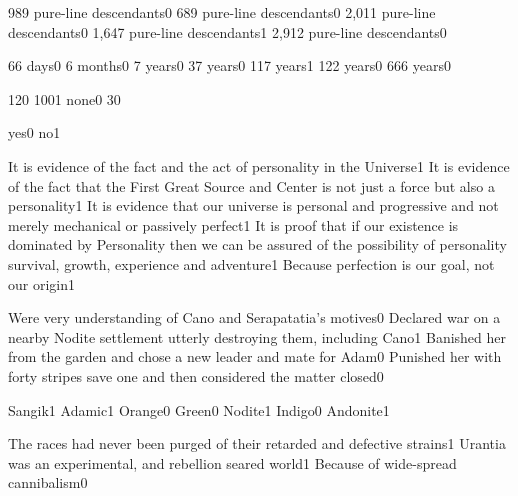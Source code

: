 {989 pure\hyp{}line descendants}{0}
{689 pure\hyp{}line descendants}{0}
{2,011 pure\hyp{}line descendants}{0}
{1,647 pure\hyp{}line descendants}{1}
{2,912 pure\hyp{}line descendants}{0}
\qstop

{66 days}{0}
{6 months}{0}
{7 years}{0}
{37 years}{0}
{117 years}{1}
{122 years}{0}
{666 years}{0}
\qstop

{12}{0}
{100}{1}
{none}{0}
{3}{0}
\qstop


{yes}{0}
{no}{1}
\qstop

{It is evidence of the fact and the act of personality in the Universe}{1}
{It is evidence of the fact that the First Great Source and Center is not just a force but also a personality}{1}
{It is evidence that our universe is personal and progressive and not merely mechanical or passively perfect}{1}
{It is proof that if our existence is dominated by Personality then we can be assured of the possibility of personality survival, growth, experience and adventure}{1}
{Because perfection is our goal, not our origin}{1}
\qstop

{Were very understanding of Cano and Serapatatia's motives}{0}
{Declared war on a nearby Nodite settlement utterly destroying them, including Cano}{1}
{Banished her from the garden and chose a new leader and mate for Adam}{0}
{Punished her with forty stripes save one and then considered the matter closed}{0}
\qstop

{Sangik}{1}
{Adamic}{1}
{Orange}{0}
{Green}{0}
{Nodite}{1}
{Indigo}{0}
{Andonite}{1}
\qstop

{The races had never been purged of their retarded and defective strains}{1}
{Urantia was an experimental, and rebellion seared world}{1}
{Because of wide-spread cannibalism}{0}
\qstop

